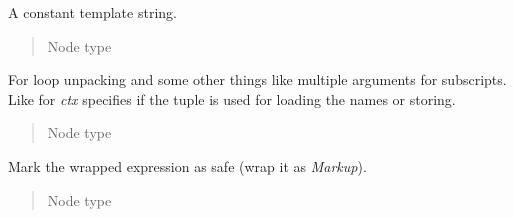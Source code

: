 \documentclass[a4paper,10pt,english]{sphinxmanual}
\begin{document}

\begin{fulllineitems}
\label{extensions:jinja2.nodes.TemplateData}
A constant template string.
\begin{quote}\begin{description}
\item[{Node type}] \leavevmode
{\hyperref[extensions:jinja2.nodes.Literal]{}}

\end{description}\end{quote}

\end{fulllineitems}


\begin{fulllineitems}
\label{extensions:jinja2.nodes.Tuple}
For loop unpacking and some other things like multiple arguments
for subscripts.  Like for {\hyperref[extensions:jinja2.nodes.Name]{}} \emph{ctx} specifies if the tuple
is used for loading the names or storing.
\begin{quote}\begin{description}
\item[{Node type}] \leavevmode
{\hyperref[extensions:jinja2.nodes.Literal]{}}

\end{description}\end{quote}

\end{fulllineitems}


\begin{fulllineitems}
\label{extensions:jinja2.nodes.MarkSafe}
Mark the wrapped expression as safe (wrap it as \emph{Markup}).
\begin{quote}\begin{description}
\item[{Node type}] \leavevmode
{\hyperref[extensions:jinja2.nodes.Expr]{}}

\end{description}\end{quote}

\end{fulllineitems}
\end{document}
